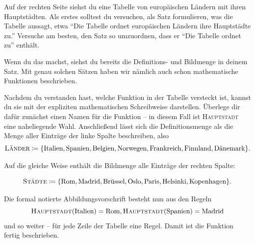 \documentclass[../../main.tex]{subfiles}
\begin{document}
\begin{example}{}
    
    Auf der rechten Seite siehst du eine Tabelle von europäischen Ländern mit ihren Hauptstädten. Als erstes solltest du versuchen, als Satz formulieren, was die Tabelle aussagt, etwa \enquote{Die Tabelle ordnet europäischen Ländern ihre Hauptstädte zu.} Versuche am besten, den Satz so umzuordnen, dass er \enquote{Die Tabelle ordnet zu} enthält.
    
    Wenn du das machst, siehst du bereits die Definitions- und Bildmenge in deinem Satz. Mit genau solchen Sätzen haben wir nämlich auch schon mathematische Funktionen beschrieben.
    
    Nachdem du verstanden hast, welche Funktion in der Tabelle versteckt ist, kannst du sie mit der expliziten mathematischen Schreibweise darstellen. Überlege dir dafür zunächst einen Namen für die Funktion -- in diesem Fall ist \textsc{Hauptstadt} eine naheliegende Wahl. Anschließend lässt sich die Definitionsmenge als die Menge aller Einträge der linke Spalte beschreiben, also
    \[\textsc{Länder}\coloneqq\{\text{Italien},\text{Spanien},\text{Belgien},\text{Norwegen},\text{Frankreich},\text{Finnland},\text{Dänemark}\}.\]
    
    Auf die gleiche Weise enthält die Bildmenge alle Einträge der rechten Spalte:
    
    \[\textsc{Städte}\coloneqq\{\text{Rom},\text{Madrid},\text{Brüssel},\text{Oslo},\text{Paris},\text{Helsinki},\text{Kopenhagen}\}.\]
    
    \sloppy
    Die formal notierte Abbildungsvorschrift besteht nun aus den Regeln \[\textsc{Hauptstadt}(\text{Italien})=\text{Rom}, \textsc{Hauptstadt}(\text{Spanien})=\text{Madrid}\] und so weiter -- für jede Zeile der Tabelle eine Regel. Damit ist die Funktion fertig beschrieben.
    \fussy
\end{example}
\end{document}
